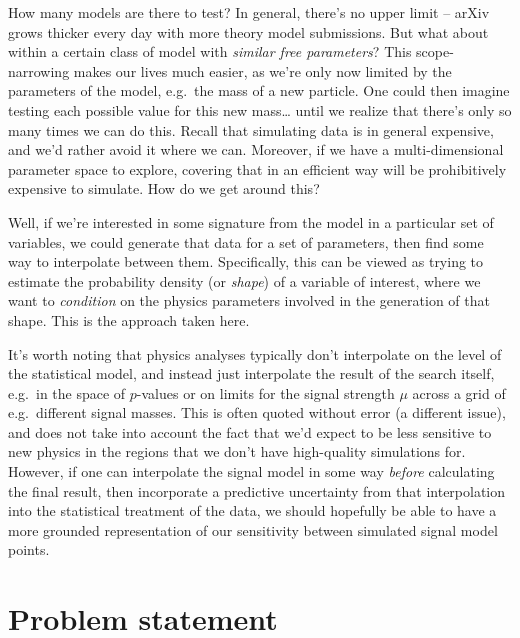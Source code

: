 \documentclass[
  11pt,
  numbers=noendperiod]{book}
\begin{document}
How many models are there to test? In general, there's no upper limit --
arXiv grows thicker every day with more theory model submissions. But
what about within a certain class of model with \emph{similar free
parameters}? This scope-narrowing makes our lives much easier, as we're
only now limited by the parameters of the model, e.g.~the mass of a new
particle. One could then imagine testing each possible value for this
new mass\ldots{} until we realize that there's only so many times we can
do this. Recall that simulating data is in general expensive, and we'd
rather avoid it where we can. Moreover, if we have a multi-dimensional
parameter space to explore, covering that in an efficient way will be
prohibitively expensive to simulate. How do we get around this?

Well, if we're interested in some signature from the model in a
particular set of variables, we could generate that data for a set of
parameters, then find some way to interpolate between them.
Specifically, this can be viewed as trying to estimate the probability
density (or \emph{shape}) of a variable of interest, where we want to
\emph{condition} on the physics parameters involved in the generation of
that shape. This is the approach taken here.

It's worth noting that physics analyses typically don't interpolate on
the level of the statistical model, and instead just interpolate the
result of the search itself, e.g.~in the space of \(p\)-values or on
limits for the signal strength \(\mu\) across a grid of e.g.~different
signal masses. This is often quoted without error (a different issue),
and does not take into account the fact that we'd expect to be less
sensitive to new physics in the regions that we don't have high-quality
simulations for. However, if one can interpolate the signal model in
some way \emph{before} calculating the final result, then incorporate a
predictive uncertainty from that interpolation into the statistical
treatment of the data, we should hopefully be able to have a more
grounded representation of our sensitivity between simulated signal
model points.

\hypertarget{problem-statement}{%
\section{Problem statement}\label{problem-statement}}
\end{document}
